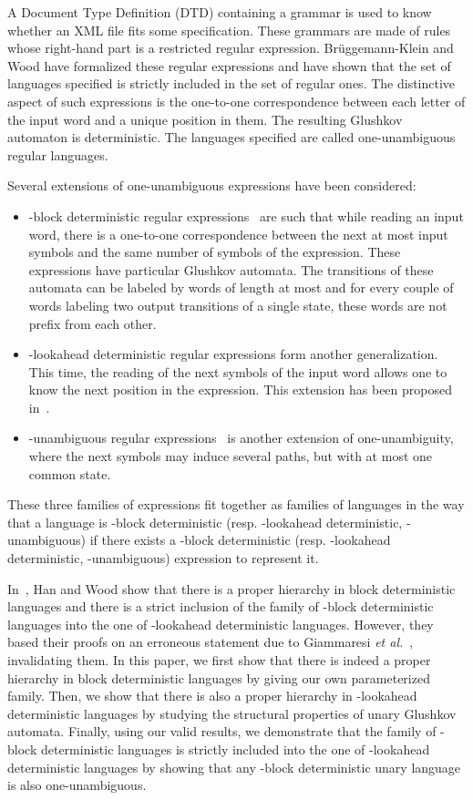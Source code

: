 \documentclass{llncs}
\begin{document}
	A Document Type Definition (DTD) containing a grammar is used to know whether an XML file fits some specification. These grammars are made of rules whose right-hand part is a restricted regular expression.
	Brüggemann-Klein and Wood have formalized these regular expressions and have shown that the set of languages specified is strictly included in the set of regular ones.
	The distinctive aspect of such expressions is the one-to-one correspondence between each letter of the input word and a unique position in them.
	The resulting Glushkov automaton is deterministic.
	The languages specified are called one-unambiguous regular languages.

	Several extensions of one-unambiguous expressions have been considered:
\begin{itemize}
	\item -block deterministic regular expressions~\cite{GMW01} are such that while reading an input word, there is a one-to-one correspondence between the next at most  input symbols and the same number of symbols of the expression.
These expressions have particular Glushkov automata.
The transitions of these automata can be labeled by words of length at most  and for every couple of words labeling two output transitions of a single state, these words are not prefix from each other. 
	\item -lookahead deterministic regular expressions form another generalization.
This time, the reading of the next  symbols of the input word allows one to know the next position in the expression. 
This extension has been proposed in~\cite{HW08}. 
  \item -unambiguous regular expressions~\cite{CFM14} is another extension of one-unam\-bi\-guity, where the next  symbols may induce several paths, but with at most one common state.
\end{itemize}

	These three families of expressions fit together as families of languages in the way that a language is -block deterministic (resp. -lookahead deterministic, -unambiguous) if there exists a -block deterministic (resp. -lookahead deterministic, -unambiguous) expression to represent it. 

	In~\cite{HW08}, Han and Wood show that there is a proper hierarchy in block deterministic languages and there is a strict inclusion of the family of -block deterministic languages into the one of -lookahead deterministic languages.
	However, they based their proofs on an erroneous statement due to Giammaresi \emph{et al.}~\cite{GMW01}, invalidating them.
	In this paper, we first show that there is indeed a proper hierarchy in block deterministic languages by giving our own parameterized family.
	Then, we show that there is also a proper hierarchy in -lookahead deterministic languages by studying the structural properties of unary Glushkov automata.
	Finally, using our valid results, we demonstrate that the family of -block deterministic languages is strictly included into the one of -lookahead deterministic languages by showing that any -block deterministic unary language is also one-unambiguous.
\end{document}
